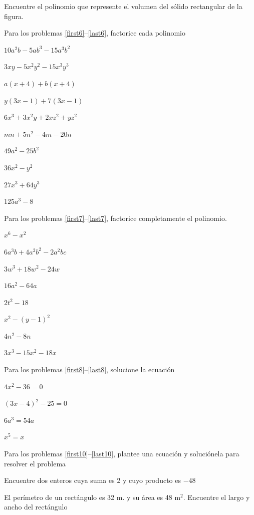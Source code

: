 \documentclass[10pt,twoside]{article}
\begin{document}
\begin{enumerate}
\begin{minipage}{.45\textwidth}
\end{minipage}\hfill
\begin{minipage}{.45\textwidth}
\item Encuentre el polinomio que represente el volumen del sólido rectangular de la figura.
\end{minipage}
Para los problemas \ref{first6}--\ref{last6}, factorice cada polinomio
\begin{multicols}{2}
\item $10a^{2}b-5ab^{3}-15a^{3}b^{2}$\label{first6}
\item $3xy-5x^{2}y^{2}-15x^{3}y^{3}$
\item $a(x+4)+b(x+4)$
\item $y(3x-1)+7(3x-1)$
\item $6x^{3}+3x^{2}y+2xz^{2}+yz^{2}$
\item $mn+5n^{2}-4m-20n$
\item $49a^{2}-25b^{2}$
\item $36x^{2}-y^{2}$
\item $27x^{3}+64y^{3}$
\item $125a^{3}-8$\label{last6}\end{multicols}
Para los problemas \ref{first7}--\ref{last7}, factorice completamente el polinomio.
\begin{multicols}{2}
\item $x^{6}-x^{2}$\label{first7}
\item $6a^{3}b+4a^{2}b^{2}-2a^{2}bc$
\item $3w^{3}+18w^{2}-24w$
\item $16a^{2}-64a$
\item $2t^{2}-18$
\item $x^{2}-(y-1)^{2}$
\item $4n^{2}-8n$
\item $3x^{3}-15x^{2}-18x$\label{last7}
\end{multicols}
Para los problemas \ref{first8}--\ref{last8}, solucione la ecuación
\begin{multicols}{2}
\item $4x^{2}-36=0$
\item $(3x-4)^{2}-25=0$
\item $6a^{3}=54a$
\item $x^{5}=x$\label{last8}
\end{multicols}
Para los problemas \ref{first10}--\ref{last10}, plantee una ecuación y soluciónela para resolver el problema
\item Encuentre dos enteros cuya suma es 2 y cuyo producto es $-48$\label{first10}
\item El perímetro de un rectángulo es 32 m. y su área es 48 m$^{2}$. Encuentre el largo y ancho del rectángulo\label{last10}
\end{enumerate}
\end{document}
